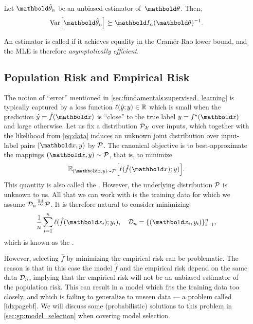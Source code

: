 \begin{fct}
  Let $\vthetahat_n$ be an unbiased estimator of~$\vtheta$.
  Then, \begin{align}
    \Var{\vthetahat_n} \succeq \inv{\mI_n(\vtheta)}.
  \end{align}
\end{fct}

An estimator is called  if it achieves equality in the Cramér-Rao lower bound, and the MLE is therefore \emph{asymptotically efficient}.

\subsection{Population Risk and Empirical Risk}\label{sec:fundamentals:supervised_learning:risk}

The notion of ``error'' mentioned in \cref{sec:fundamentals:supervised_learning} is typically captured by a loss function $\ell(\hat{y}; y) \in \mathbb{R}$ which is small when the prediction $\hat{y} = \hat{f}(\vx)$ is ``close'' to the true label $y = \opt{f}(\vx)$ and large otherwise.
Let us fix a distribution $\mathcal{P}_{\mathcal{X}}$ over inputs, which together with the likelihood from \cref{eq:data} induces an unknown joint distribution over input-label pairs $(\vx, y)$ by $\mathcal{P}$.
The canonical objective is to best-approximate the mappings $(\vx,y) \sim \spP$, that is, to minimize \begin{align}
  \E[(\vx, y) \sim \spP]{\ell(\hat{f}(\vx); y)}.
\end{align}
This quantity is also called the .
However, the underlying distribution $\mathcal{P}$ is unknown to us.
All that we can work with is the training data for which we assume $\mathcal{D}_n \operatorname*{\smash{\overset{\mathrm{iid}}{\sim}}} \mathcal{P}$.
It is therefore natural to consider minimizing \begin{align}
  \frac{1}{n} \sum_{i=1}^n \ell(\hat{f}(\vx_i); y_i), \quad \spD_n = \{(\vx_i, y_i)\}_{i=1}^n,
\end{align} which is known as the .

However, selecting $\hat{f}$ by minimizing the empirical risk can be problematic.
The reason is that in this case the model $\hat{f}$ and the empirical risk depend on the same data $\mathcal{D}_n$, implying that the empirical risk will not be an unbiased estimator of the population risk.
This can result in a model which fits the training data too closely, and which is failing to generalize to unseen data --- a problem called [idxpagebf].
We will discuss some (probabilistic) solutions to this problem in \cref{sec:gp:model_selection} when covering model selection.

